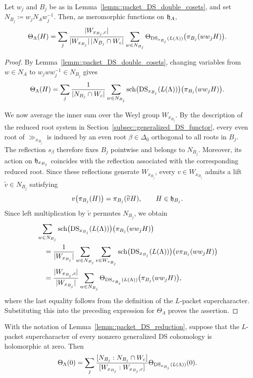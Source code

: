 \begin{lemma}
\label{lemm::packet_DS_reduction}
Let $w_j$ and $B_j$ be as in Lemma~\ref{lemm::packet_DS_double_cosets}, and set
$
N_{B_j}\coloneqq w_jN_Aw_j^{-1}.
$
Then, as meromorphic functions on ${\mathfrak h}_A$,
\[
\Theta_\Lambda(H)
=
\sum_j
\frac{|W_{x_{B_j},c}|}
{|W_{x_{B_j}}|\,|N_{B_j}\cap W_c|}
\sum_{w\in N_{B_j}}
\Theta_{\operatorname{DS}_{x_{B_j}}(L(\Lambda))}
\bigl(\pi_{B_j}(ww_jH)\bigr).
\]
\end{lemma}

\begin{proof}
By Lemma~\ref{lemm::packet_DS_double_cosets}, changing variables from $w\in N_A$ to $w_jww_j^{-1}\in N_{B_j}$ gives
\[
\Theta_\Lambda(H)
=
\sum_j
\frac{1}{|N_{B_j}\cap W_c|}
\sum_{w\in N_{B_j}}
{\operatorname{sch}}\bigl(\operatorname{DS}_{x_{B_j}}(L(\Lambda))\bigr)
\bigl(\pi_{B_j}(ww_jH)\bigr).
\]

We now average the inner sum over the Weyl group $W_{x_{B_j}}$. 
By the description of the reduced root system in
Section~\ref{subsec::generalized_DS_functor}, every
even root of $\gg_{x_{B_j}}$ is induced by an even root
$\beta\in\Delta_{\bar0}$ orthogonal to all roots in $B_j$.
The reflection $s_\beta$ therefore fixes $B_j$ pointwise
and belongs to $N_{B_j}$. Moreover, its action on
${\mathfrak h}_{x_{B_j}}$ coincides with the reflection associated
with the corresponding reduced root. Since these
reflections generate $W_{x_{B_j}}$, every
$v\in W_{x_{B_j}}$ admits a lift
$\widetilde v\in N_{B_j}$ satisfying
\[
v\bigl(\pi_{B_j}(H)\bigr)
=
\pi_{B_j}(\widetilde vH),
\qquad H\in{\mathfrak h}_{B_j}.
\]
Since left multiplication by $\widetilde v$ permutes $N_{B_j}$, we obtain
\[
\begin{aligned}
&\sum_{w\in N_{B_j}}
{\operatorname{sch}}\bigl(\operatorname{DS}_{x_{B_j}}(L(\Lambda))\bigr)
\bigl(\pi_{B_j}(ww_jH)\bigr)\\
&\quad=
\frac{1}{|W_{x_{B_j}}|}
\sum_{w\in N_{B_j}}
\sum_{v\in W_{x_{B_j}}}
{\operatorname{sch}}\bigl(\operatorname{DS}_{x_{B_j}}(L(\Lambda))\bigr)
\bigl(v\pi_{B_j}(ww_jH)\bigr)\\
&\quad=
\frac{|W_{x_{B_j},c}|}{|W_{x_{B_j}}|}
\sum_{w\in N_{B_j}}
\Theta_{\operatorname{DS}_{x_{B_j}}(L(\Lambda))}
\bigl(\pi_{B_j}(ww_jH)\bigr),
\end{aligned}
\]
where the last equality follows from the definition of the $L$-packet supercharacter. Substituting this into the preceding expression for $\Theta_\Lambda$ proves the assertion.
\end{proof}


\begin{proposition}\label{prop::key_prop_nonintegral_case}
With the notation of Lemma~\ref{lemm::packet_DS_reduction}, suppose that the $L$-packet supercharacter of every nonzero generalized DS cohomology is holomorphic at zero. Then
\[
\Theta_\Lambda(0)
=
\sum_j
\frac{[N_{B_j}:N_{B_j}\cap W_c]}
{[W_{x_{B_j}}:W_{x_{B_j},c}]}
\Theta_{\operatorname{DS}_{x_{B_j}}(L(\Lambda))}(0).
\]
\end{proposition}

